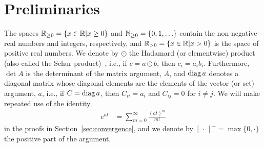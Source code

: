 \section{Preliminaries}\label{sec:notation}
The spaces $\mathbb{R}_{\geq 0} = \{x \in \mathbb{R} \vert x \geq 0\}$ and $\mathbb{N}_{\geq 0} = \{0, 1, \ldots\}$ contain the non-negative real numbers and integers, respectively, and $\mathbb{R}_{> 0} = \{x \in \mathbb{R} \vert x > 0\}$ is the space of positive real numbers. We denote by $\odot$ the Hadamard (or elementwise) product (also called the Schur product)~\cite{Horn:Johnson:1991, Horn:Johnson:2012}, i.e., if $c = a \odot b$, then $c_i = a_i b_i$. Furthermore, $\det A$ is the determinant of the matrix argument, $A$, and $\operatorname{diag} a$ denotes a diagonal matrix whose diagonal elements are the elements of the vector (or set) argument, $a$, i.e., if $C = \operatorname{diag} a$, then $C_{ii} = a_i$ and $C_{ij} = 0$ for $i \neq j$.
We will make repeated use of the identity
%
\begin{align}\label{eq:exponential}
	e^{at} &= \sum_{m=0}^\infty \frac{(at)^m}{m!}
\end{align}
%
in the proofs in Section~\ref{sec:convergence}, and we denote by $[\,\cdot\,]^+ = \max\{0, \cdot\}$ the positive part of the argument.
